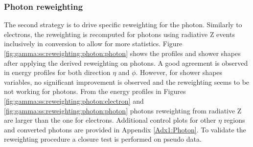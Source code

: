 \subsubsection{Photon reweighting}
The second strategy is to drive specific reweighting for the photon. Similarly to electrons, the reweighting is recomputed for photons using radiative Z events inclusively in conversion to allow for more statistics. Figure \ref{fig:gamma:ss:reweighting:photon:photon} shows the profiles and shower shapes after applying the derived reweighting on photons. A good agreement is observed in energy profiles for both direction $\eta$ and $\phi$. However, for shower shapes variables, no significant improvement is observed and the reweighting seems to be not working for photons. From the energy profiles in Figures \ref{fig:gamma:ss:reweighting:photon:electron} and \ref{fig:gamma:ss:reweighting:photon:photon} photons reweighting from radiative Z are larger than the one for electrons. Additional control plots for other $\eta$ regions and converted photons are provided in Appendix \ref{Adx1:Photon}. To validate the reweighting procedure a closure test is performed on pseudo data.
